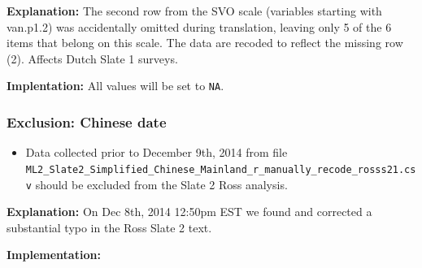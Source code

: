 \documentclass[]{article}
\newenvironment{Shaded}{\begin{snugshade}}{\end{snugshade}}
\newcommand{\KeywordTok}[1]{\textcolor[rgb]{0.94,0.87,0.69}{{#1}}}
\newcommand{\DecValTok}[1]{\textcolor[rgb]{0.86,0.86,0.80}{{#1}}}
\newcommand{\StringTok}[1]{\textcolor[rgb]{0.80,0.58,0.58}{{#1}}}
\newcommand{\OtherTok}[1]{\textcolor[rgb]{0.94,0.94,0.56}{{#1}}}
\newcommand{\NormalTok}[1]{\textcolor[rgb]{0.80,0.80,0.80}{{#1}}}
\begin{document}
\textbf{Explanation:} The second row from the SVO scale (variables
starting with van.p1.2) was accidentally omitted during translation,
leaving only 5 of the 6 items that belong on this scale. The data are
recoded to reflect the missing row (2). Affects Dutch Slate 1 surveys.

\textbf{Implentation:} All values will be set to \texttt{NA}.

\begin{Shaded}
\end{Shaded}

\subsubsection{\textbf{Exclusion:} Chinese
date}\label{exclusion-chinese-date}

\begin{itemize}
\itemsep1pt\parskip0pt
\item
  Data collected prior to December 9th, 2014 from file
  \texttt{ML2\_Slate2\_Simplified\_Chinese\_Mainland\_r\_manually\_recode\_rosss21.csv}
  should be excluded from the Slate 2 Ross analysis.
\end{itemize}

\textbf{Explanation:} On Dec 8th, 2014 12:50pm EST we found and
corrected a substantial typo in the Ross Slate 2 text.

\textbf{Implementation:}
\end{document}
